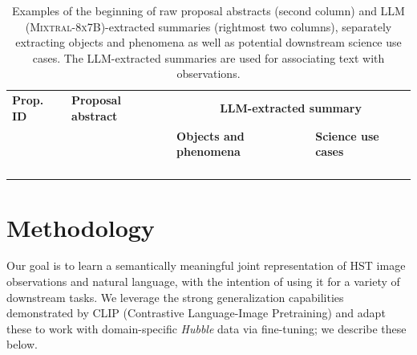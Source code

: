 \documentclass[10pt]{article} %
\newcommand{\hubble}{\emph{Hubble}\xspace}
\begin{document}
\begin{landscape}
      \begin{table}[h!]
          \centering
          \begin{tabular}{m{1.8cm} m{8cm} m{5cm} m{6cm}}
              \toprule
              \bfseries Prop. ID & \centering\arraybackslash \bfseries Proposal abstract & \multicolumn{2}{c}{\bfseries LLM-extracted summary} \tabularnewline
              \cmidrule(r){3-4}
              & & \centering\arraybackslash \bfseries Objects and phenomena & \centering\arraybackslash \bfseries Science use cases \tabularnewline
              \midrule
               & {\scriptsize } & {\scriptsize } & {\scriptsize } \tabularnewline
              \midrule
               & {\scriptsize } & {\scriptsize } & {\scriptsize } \tabularnewline
              \midrule
               & {\scriptsize } & {\scriptsize } & {\scriptsize } \tabularnewline
              \midrule
               & {\scriptsize } & {\scriptsize } & {\scriptsize } \tabularnewline
              \bottomrule
          \end{tabular}
          \caption{Examples of the beginning of raw proposal abstracts (second column) and LLM (\textsc{Mixtral-8x7B})-extracted summaries (rightmost two columns), separately extracting objects and phenomena as well as potential downstream science use cases. The LLM-extracted summaries are used for associating text with observations.}
          \label{tab:datasetsumm}
      \end{table}
  \end{landscape}

\section{Methodology}
\label{sec:methodology}

Our goal is to learn a semantically  meaningful joint representation of HST image observations and natural language, with the intention of using it for a variety of downstream tasks. We leverage the strong generalization capabilities demonstrated by CLIP (Contrastive Language-Image Pretraining) and adapt these to work with domain-specific \hubble data via fine-tuning; we describe these below.
\end{document}
